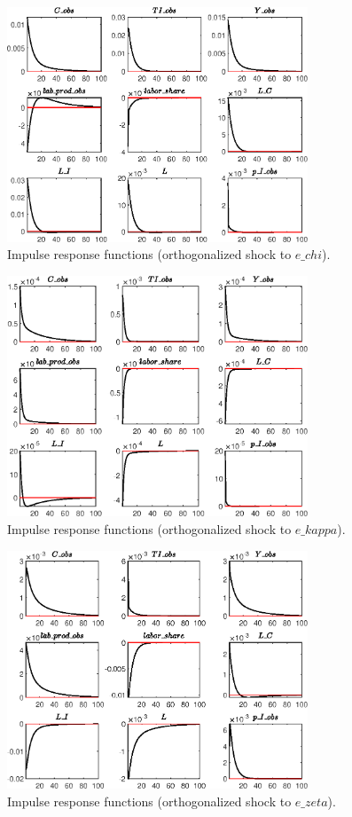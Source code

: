 \begin{figure}[H]
\centering 
\includegraphics[width=0.80\textwidth]{directed_search_est/graphs/directed_search_est_IRF_e_chi}
\caption{Impulse response functions (orthogonalized shock to $e\_chi$).}
\label{Fig:IRF:e_chi}
\end{figure}
 
\begin{figure}[H]
\centering 
\includegraphics[width=0.80\textwidth]{directed_search_est/graphs/directed_search_est_IRF_e_kappa}
\caption{Impulse response functions (orthogonalized shock to $e\_kappa$).}
\label{Fig:IRF:e_kappa}
\end{figure}
 
\begin{figure}[H]
\centering 
\includegraphics[width=0.80\textwidth]{directed_search_est/graphs/directed_search_est_IRF_e_zeta}
\caption{Impulse response functions (orthogonalized shock to $e\_zeta$).}
\label{Fig:IRF:e_zeta}
\end{figure}
 
 
